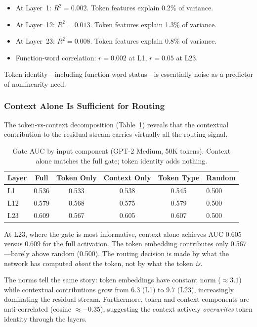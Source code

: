 \documentclass[11pt]{article}
\begin{document}
\begin{itemize}
    \item At Layer~1: $R^2 = 0.002$. Token features explain 0.2\% of variance.
    \item At Layer~12: $R^2 = 0.013$. Token features explain 1.3\% of variance.
    \item At Layer~23: $R^2 = 0.008$. Token features explain 0.8\% of variance.
    \item Function-word correlation: $r = 0.002$ at L1, $r = 0.05$ at L23.
\end{itemize}

\noindent Token identity---including function-word status---is essentially noise as a predictor of nonlinearity need.

\subsubsection{Context Alone Is Sufficient for Routing}

The token-vs-context decomposition (Table~\ref{tab:decomp}) reveals that the contextual contribution to the residual stream carries virtually all the routing signal.

\begin{table}[t]
\centering
\caption{Gate AUC by input component (GPT-2 Medium, 50K tokens). Context alone matches the full gate; token identity adds nothing.}
\label{tab:decomp}
\begin{tabular}{lccccl}
\toprule
Layer & Full & Token Only & Context Only & Token Type & Random \\
\midrule
L1 & 0.536 & 0.533 & 0.538 & 0.545 & 0.500 \\
L12 & 0.579 & 0.568 & 0.575 & 0.579 & 0.500 \\
L23 & 0.609 & 0.567 & 0.605 & 0.607 & 0.500 \\
\bottomrule
\end{tabular}
\end{table}

At L23, where the gate is most informative, context alone achieves AUC 0.605 versus 0.609 for the full activation. The token embedding contributes only 0.567---barely above random (0.500). The routing decision is made by what the network has computed \textit{about} the token, not by what the token \textit{is}.

The norms tell the same story: token embeddings have constant norm ($\approx 3.1$) while contextual contributions grow from 6.3 (L1) to 9.7 (L23), increasingly dominating the residual stream. Furthermore, token and context components are anti-correlated (cosine $\approx -0.35$), suggesting the context actively \textit{overwrites} token identity through the layers.
\end{document}
